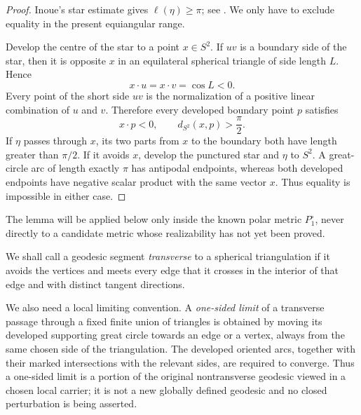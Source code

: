 \documentclass[12pt,a4paper]{article}
\theoremstyle{definition}
\begin{document}
\begin{proof}
Inoue's star estimate gives \(\ell(\eta)\ge\pi\); see
\cite[Lemma~8.4]{Inoue2008}.  We only have to exclude equality in the present
equiangular range.

Develop the centre of the star to a point \(x\in S^2\). If \(uv\) is a
boundary side of the star, then it is opposite \(x\) in an equilateral
spherical triangle of side length \(L\). Hence
\[
        x\cdot u=x\cdot v=\cos L<0.
\]
Every point of the short side \(uv\) is the normalization of a positive
linear combination of \(u\) and \(v\). Therefore every developed boundary
point \(p\) satisfies
\[
        x\cdot p<0,
        \qquad d_{S^2}(x,p)>\frac\pi2.
\]
If \(\eta\) passes through \(x\), its two parts from \(x\) to the boundary
both have length greater than \(\pi/2\). If it avoids \(x\), develop the
punctured star and \(\eta\) to \(S^2\). A great-circle arc of length exactly
\(\pi\) has antipodal endpoints, whereas both developed endpoints have
negative scalar product with the same vector \(x\). Thus equality is
impossible in either case.
\end{proof}

The lemma will be applied below only inside the known polar metric
\(P_1^\circ\), never directly to a candidate metric whose realizability has
not yet been proved.

We shall call a geodesic segment \emph{transverse} to a spherical
triangulation if it avoids the vertices and meets every edge that it crosses
in the interior of that edge and with distinct tangent directions.

We also need a local limiting convention.  A \emph{one-sided limit} of a
transverse passage through a fixed finite union of triangles is obtained by
moving its developed supporting great circle towards an edge or a vertex,
always from the same chosen side of the triangulation.  The developed
oriented arcs, together with their marked intersections with the relevant
sides, are required to converge.  Thus a one-sided limit is a portion of the
original nontransverse geodesic viewed in a chosen local carrier; it is not a
new globally defined geodesic and no closed perturbation is being asserted.
\end{document}
